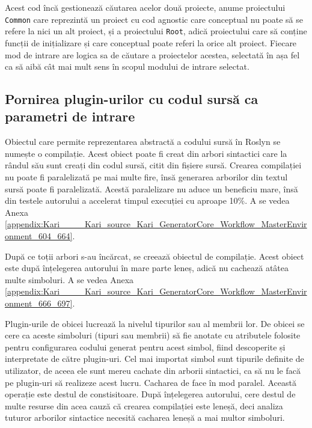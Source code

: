 \documentclass[a4paper,12pt]{report}
\begin{document}
Acest cod încă gestionează căutarea acelor două proiecte, anume proiectului \texttt{Common} care reprezintă un proiect cu cod agnostic care conceptual nu poate să se refere la nici un alt proiect, și a proiectului \texttt{Root}, adică proiectului care să conține funcții de inițializare și care conceptual poate referi la orice alt proiect.
Fiecare mod de intrare are logica sa de căutare a proiectelor acestea, selectată în așa fel ca să aibă cât mai mult sens în scopul modului de intrare selectat.

\subsection{Pornirea plugin-urilor cu codul sursă ca parametri de intrare}

Obiectul care permite reprezentarea abstractă a codului sursă în Roslyn se numește o compilație.
Acest obiect poate fi creat din arbori sintactici care la rândul său sunt creați din codul sursă, citit din fișiere sursă.
Crearea compilației nu poate fi paralelizată pe mai multe fire, însă generarea arborilor din textul sursă poate fi paralelizată.
Acestă paralelizare nu aduce un beneficiu mare, însă din testele autorului a accelerat timpul execuției cu aproape 10\%.
A se vedea Anexa \ref{appendix:Kari____Kari_source_Kari_GeneratorCore_Workflow_MasterEnvironment_604_664}.

După ce toții arbori s-au încărcat, se creează obiectul de compilație.
Acest obiect este după înțelegerea autorului în mare parte leneș, adică nu cachează atâtea multe simboluri.
A se vedea Anexa \ref{appendix:Kari____Kari_source_Kari_GeneratorCore_Workflow_MasterEnvironment_666_697}.

Plugin-urile de obicei lucrează la nivelul tipurilor sau al membrii lor.
De obicei se cere ca aceste simboluri (tipuri sau membrii) să fie anotate cu atributele folosite pentru configurarea codului generat pentru acest simbol, fiind descoperite și interpretate de către plugin-uri.
Cel mai importat simbol sunt tipurile definite de utilizator, de aceea ele sunt mereu cachate din arborii sintactici, ca să nu le facă pe plugin-uri să realizeze acest lucru.
Cacharea de face în mod paralel.
Această operație este destul de constisitoare.
După înțelegerea autorului, cere destul de multe resurse din acea cauză că crearea compilației este leneșă, deci analiza tuturor arborilor sintactice necesită cacharea leneșă a mai multor simboluri.
\inputminted[firstline=699, lastline=727]{cs}{../Kari/source/Kari.GeneratorCore/Workflow/MasterEnvironment.cs}
\end{document}
